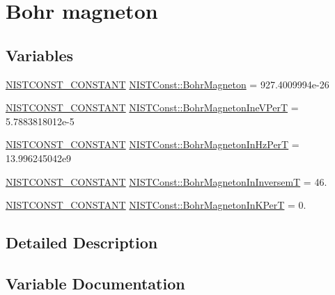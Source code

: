\hypertarget{group___n_i_s_t_const-_bohr_magneton}{}\section{Bohr magneton}
\label{group___n_i_s_t_const-_bohr_magneton}
\subsection*{Variables}
\begin{DoxyCompactItemize}
\item 
\mbox{\hyperlink{_n_i_s_t_const_8hpp_a2b0fc1d7452373f816175dd86ce26729}{N\+I\+S\+T\+C\+O\+N\+S\+T\+\_\+\+C\+O\+N\+S\+T\+A\+NT}} \mbox{\hyperlink{group___n_i_s_t_const-_bohr_magneton_ga2804e91f010b40a5c11a46506e6c1926}{N\+I\+S\+T\+Const\+::\+Bohr\+Magneton}} = 927.\+4009994e-\/26
\item 
\mbox{\hyperlink{_n_i_s_t_const_8hpp_a2b0fc1d7452373f816175dd86ce26729}{N\+I\+S\+T\+C\+O\+N\+S\+T\+\_\+\+C\+O\+N\+S\+T\+A\+NT}} \mbox{\hyperlink{group___n_i_s_t_const-_bohr_magneton_ga5a7384205d0127ffe031897a6b0c3dca}{N\+I\+S\+T\+Const\+::\+Bohr\+Magneton\+Ine\+V\+PerT}} = 5.\+7883818012e-\/5
\item 
\mbox{\hyperlink{_n_i_s_t_const_8hpp_a2b0fc1d7452373f816175dd86ce26729}{N\+I\+S\+T\+C\+O\+N\+S\+T\+\_\+\+C\+O\+N\+S\+T\+A\+NT}} \mbox{\hyperlink{group___n_i_s_t_const-_bohr_magneton_gaa57dcf7dffc991b2b8ab1009687691e8}{N\+I\+S\+T\+Const\+::\+Bohr\+Magneton\+In\+Hz\+PerT}} = 13.\+996245042e9
\item 
\mbox{\hyperlink{_n_i_s_t_const_8hpp_a2b0fc1d7452373f816175dd86ce26729}{N\+I\+S\+T\+C\+O\+N\+S\+T\+\_\+\+C\+O\+N\+S\+T\+A\+NT}} \mbox{\hyperlink{group___n_i_s_t_const-_bohr_magneton_ga4ad979b4ddb4aeebcbff236726fa64ec}{N\+I\+S\+T\+Const\+::\+Bohr\+Magneton\+In\+InversemT}} = 46.
\item 
\mbox{\hyperlink{_n_i_s_t_const_8hpp_a2b0fc1d7452373f816175dd86ce26729}{N\+I\+S\+T\+C\+O\+N\+S\+T\+\_\+\+C\+O\+N\+S\+T\+A\+NT}} \mbox{\hyperlink{group___n_i_s_t_const-_bohr_magneton_gab847d7f91c3980277d352fd100d904f2}{N\+I\+S\+T\+Const\+::\+Bohr\+Magneton\+In\+K\+PerT}} = 0.
\end{DoxyCompactItemize}


\subsection{Detailed Description}


\subsection{Variable Documentation}
\mbox{\label{group___n_i_s_t_const-_bohr_magneton_ga2804e91f010b40a5c11a46506e6c1926}} 
